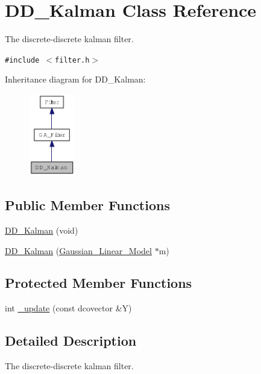 \hypertarget{class_d_d___kalman}{
\section{DD\_\-Kalman Class Reference}
\label{class_d_d___kalman}
}
The discrete-discrete kalman filter.  


{\tt \#include $<$filter.h$>$}

Inheritance diagram for DD\_\-Kalman:\nopagebreak
\begin{figure}[H]
\begin{center}
\leavevmode
\includegraphics[width=57pt]{class_d_d___kalman__inherit__graph}
\end{center}
\end{figure}
\subsection*{Public Member Functions}
\begin{CompactItemize}
\item 
\hyperlink{class_d_d___kalman_6609717ac09c6a85dfbd1417b736a54c}{DD\_\-Kalman} (void)
\item 
\hyperlink{class_d_d___kalman_dfc3b894cf701465b05ed9b49a53f49e}{DD\_\-Kalman} (\hyperlink{class_gaussian___linear___model}{Gaussian\_\-Linear\_\-Model} $\ast$m)
\end{CompactItemize}
\subsection*{Protected Member Functions}
\begin{CompactItemize}
\item 
int \hyperlink{class_d_d___kalman_a04e9be77c495296673227860833c9fc}{\_\-update} (const dcovector \&Y)
\end{CompactItemize}


\subsection{Detailed Description}
The discrete-discrete kalman filter. 

